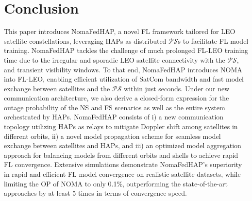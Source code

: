 \documentclass[letter,journal]{IEEEtran}
\begin{document}
\section{Conclusion}\label{conclusion}
This paper introduces NomaFedHAP, a novel FL framework tailored for LEO satellite constellations, leveraging HAPs as distributed $\mathcal {PS}$s to facilitate FL model training. NomaFedHAP tackles the challenge of much prolonged FL-LEO training time due to the irregular and sporadic LEO satellite connectivity with the $\mathcal {PS}$, and transient visibility windows. To that end, NomaFedHAP introduces NOMA into FL-LEO, enabling efficient utilization of SatCom bandwidth and fast model exchange between satellites and the $\mathcal {PS}$ within just seconds. Under our new communication architecture, we also derive a closed-form expression for the outage probability of the NS and FS scenarios as well as the entire system orchestrated by HAPs. NomaFedHAP consists of i) a new communication topology utilizing HAPs as relays to mitigate Doppler shift among satellites in different orbits, ii) a novel model propagation scheme for seamless model exchange between satellites and HAPs, and iii) an optimized model aggregation approach for balancing models from different orbits and shells to achieve rapid FL convergence. Extensive simulations demonstrate NomaFedHAP's superiority in rapid and efficient FL model convergence on realistic satellite datasets, while limiting the OP of NOMA to only 0.1\%, outperforming the state-of-the-art approaches by at least 5 times in terms of convergence speed.
\end{document}
